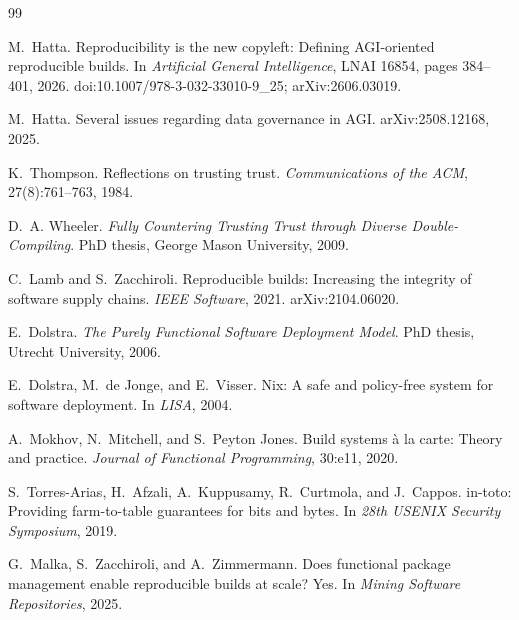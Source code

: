 \documentclass[11pt]{article}
\begin{document}
\begin{thebibliography}{99}

M.~Hatta.
\newblock Reproducibility is the new copyleft: Defining AGI-oriented
  reproducible builds.
\newblock In \emph{Artificial General Intelligence}, LNAI 16854, pages
  384--401, 2026.
\newblock doi:10.1007/978-3-032-33010-9\_25; arXiv:2606.03019.

M.~Hatta.
\newblock Several issues regarding data governance in AGI.
\newblock arXiv:2508.12168, 2025.

K.~Thompson.
\newblock Reflections on trusting trust.
\newblock \emph{Communications of the ACM}, 27(8):761--763, 1984.

D.~A. Wheeler.
\newblock \emph{Fully Countering Trusting Trust through Diverse
  Double-Compiling}.
\newblock PhD thesis, George Mason University, 2009.

C.~Lamb and S.~Zacchiroli.
\newblock Reproducible builds: Increasing the integrity of software supply
  chains.
\newblock \emph{IEEE Software}, 2021. arXiv:2104.06020.

E.~Dolstra.
\newblock \emph{The Purely Functional Software Deployment Model}.
\newblock PhD thesis, Utrecht University, 2006.

E.~Dolstra, M.~de Jonge, and E.~Visser.
\newblock Nix: A safe and policy-free system for software deployment.
\newblock In \emph{LISA}, 2004.

A.~Mokhov, N.~Mitchell, and S.~Peyton Jones.
\newblock Build systems \`a la carte: Theory and practice.
\newblock \emph{Journal of Functional Programming}, 30:e11, 2020.

S.~Torres-Arias, H.~Afzali, A.~Kuppusamy, R.~Curtmola, and J.~Cappos.
\newblock in-toto: Providing farm-to-table guarantees for bits and bytes.
\newblock In \emph{28th USENIX Security Symposium}, 2019.

G.~Malka, S.~Zacchiroli, and A.~Zimmermann.
\newblock Does functional package management enable reproducible builds at
  scale? Yes.
\newblock In \emph{Mining Software Repositories}, 2025.

\end{thebibliography}
\end{document}
